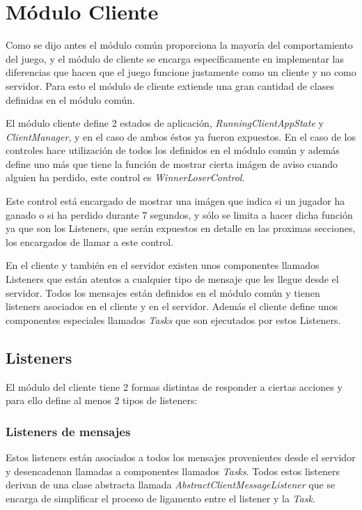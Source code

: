 \documentclass[a4paper,12pt,openany,oneside]{book}
\begin{document}
\section{Módulo Cliente}
Como se dijo antes el módulo común proporciona la mayoría del comportamiento del juego, y el módulo de cliente se encarga específicamente en implementar las diferencias que hacen que el juego funcione justamente como un cliente y no como servidor.
Para esto el módulo de cliente extiende una gran cantidad de clases definidas en el módulo común.

El módulo cliente define 2 estados de aplicación, \textit{RunningClientAppState} y \textit{ClientManager}, y en el caso de ambos éstos ya fueron expuestos. En el caso de los controles hace utilización de todos los definidos en el módulo común y además define uno más que tiene la función de mostrar cierta imágen de aviso cuando alguien ha perdido, este control es \textit{WinnerLoserControl}.

Este control está encargado de mostrar una imágen que indica si un jugador ha ganado o si ha perdido durante 7 segundos, y sólo se limita a hacer dicha función ya que son los Listeners, que serán expuestos en detalle en las proximas secciones, los encargados de llamar a este control.

En el cliente y también en el servidor existen unos componentes llamados Listeners que están atentos a cualquier tipo de mensaje que les llegue desde el servidor. Todos los mensajes están definidos en el módulo común y tienen listeners asociados en el cliente y en el servidor. Además el cliente define unos componentes especiales llamados \textit{Tasks} que son ejecutados por estos Listeners.
\subsection{Listeners}
El módulo del cliente tiene 2 formas distintas de responder a ciertas acciones y para ello define al menos 2 tipos de listeners:
\subsubsection{Listeners de mensajes}
Estos listeners están asociados a todos los mensajes provenientes desde el servidor y desencadenan llamadas a componentes llamados \textit{Tasks}. Todos estos listeners derivan de una clase abstracta llamada \textit{AbstractClientMessageListener} que se encarga de simplificar el proceso de ligamento entre el listener y la \textit{Task}.
\end{document}
